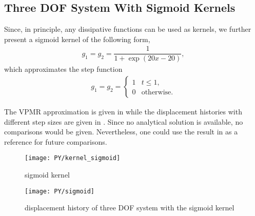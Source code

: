 \subsection{Three DOF System With Sigmoid Kernels}
Since, in principle, any dissipative functions can be used as kernels, we further present a sigmoid kernel of the following form,
\begin{gather}
g_1=g_2=\dfrac{1}{1+\exp\left(20x-20\right)},
\end{gather}
which approximates the step function
\begin{gather}
g_1=g_2=\left\{
\begin{array}{ll}
1&t\leqslant1,\\
0&\text{otherwise.}
\end{array}
\right.
\end{gather}

The VPMR approximation is given in  while the displacement histories with different step sizes are given in . Since no analytical solution is available, no comparisons would be given. Nevertheless, one could use the result in  as a reference for future comparisons.
\begin{figure}[H]
\centering
\texttt{[image: PY/kernel\_sigmoid]}
\caption{sigmoid kernel}\label{fig:sigmoid_kernel}
\end{figure}
\begin{figure}[H]
\centering
\texttt{[image: PY/sigmoid]}
\caption{displacement history of three DOF system with the sigmoid kernel}\label{fig:three_sigmoid}
\end{figure}